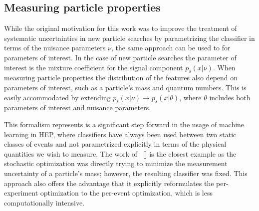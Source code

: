 \documentclass[aoas,preprint]{imsart}
\newcommand{\citek}[1]{[\cite{#1}]}
\numberwithin{equation}{section}
\theoremstyle{plain}
\begin{document}

\subsection{Measuring particle properties}

While the original motivation for this work was to improve the treatment of systematic uncertainties in new particle searches by parametrizing the classifier in terms of the nuisance parameters $\nu$, the same approach can be used to for parameters of interest. In the case of new particle searches the parameter of interest is the mixture coefficient for the signal component $p_s(x|\nu)$. When measuring particle properties the distribution of the features also depend on parameters of interest, such as a particle's mass and quantum numbers. This is easily accommodated by extending $p_s(x|\nu) \to p_s(x|\theta)$, where $\theta$ includes both parameters of interest and nuisance parameters. 

This formalism represents is a significant step forward in the usage of machine learning in HEP, where classifiers have always been used between two static classes of events and not parametrized explicitly in terms of the physical quantities we wish to measure. The work of  ~\citek{Whiteson:2006ws} is the closest example as the stochastic optimization was directly trying to minimize the measurement uncertainty of a particle's mass; however, the resulting classifier was fixed. This approach also offers the advantage that it explicitly reformulates the per-experiment optimization to the per-event optimization, which is less computationally intensive.
\end{document}
